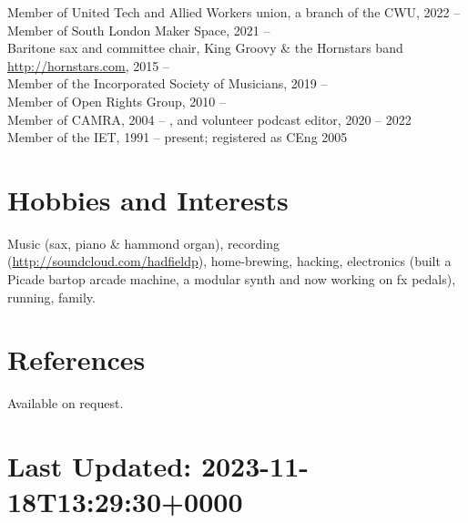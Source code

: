 \documentclass[line]{resume}
\begin{document}
\begin{resume}
    Member of United Tech and Allied Workers union, a branch of the CWU, 2022 --                            \vspace{0.5mm}\\%
    Member of South London Maker Space, 2021 --                                                             \vspace{0.5mm}\\%
    Baritone sax and committee chair, King Groovy \& the Hornstars band \url{http://hornstars.com}, 2015 -- \vspace{0.5mm}\\%
    Member of the Incorporated Society of Musicians, 2019 --                                                \vspace{0.5mm}\\%
    Member of Open Rights Group, 2010 --                                                                    \vspace{0.5mm}\\%
    Member of CAMRA, 2004 -- , and volunteer podcast editor, 2020 -- 2022                                   \vspace{0.5mm}\\%
    Member of the IET, 1991 -- present; registered as CEng 2005

    \section{\mysidestyle Hobbies and Interests}

    Music (sax, piano \& hammond organ), recording (\url{http://soundcloud.com/hadfieldp}), home-brewing, hacking,
    electronics (built a Picade bartop arcade machine, a modular synth and now working on fx pedals), running, family.

    \section{\mysidestyle References}

    Available on request.

    \section{\mysidestyle Last Updated: 2023-11-18T13:29:30+0000}

\end{resume}
\end{document}
